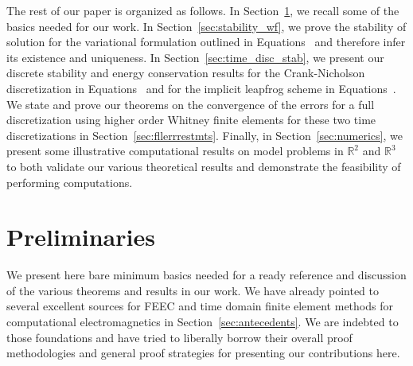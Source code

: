 \documentclass{amsart}
\theoremstyle{thmstyleone}%
\theoremstyle{thmstyletwo}%
\theoremstyle{thmstylethree}%
\def\R{\mathbb{R}}
\begin{document}
The rest of our paper is organized as follows. In Section~\ref{sec:prelim}, we recall some of the basics needed for our work. In Section~\ref{sec:stability_wf}, we prove the stability of solution for the variational formulation outlined in Equations~ and therefore infer its existence and uniqueness. In Section~\ref{sec:time_disc_stab}, we present our discrete stability and energy conservation results for the Crank-Nicholson discretization in Equations~ and for the implicit leapfrog scheme in Equations~. We state and prove our theorems on the convergence of the errors for a full discretization using higher order Whitney finite elements for these two time discretizations in Section~\ref{sec:fllerrrestmts}. Finally, in Section~\ref{sec:numerics}, we present some illustrative computational results on model problems in $\R^2$ and $\R^3$ to both validate our various theoretical results and demonstrate the feasibility of performing computations.


\section{Preliminaries} \label{sec:prelim}

We present here bare minimum basics needed for a ready reference and discussion of the various theorems and results in our work. We have already pointed to several excellent sources for FEEC and time domain finite element methods for computational electromagnetics in Section~\ref{sec:antecedents}. We are indebted to those foundations and have tried to liberally borrow their overall proof methodologies and general proof strategies for presenting our contributions here.
\end{document}
